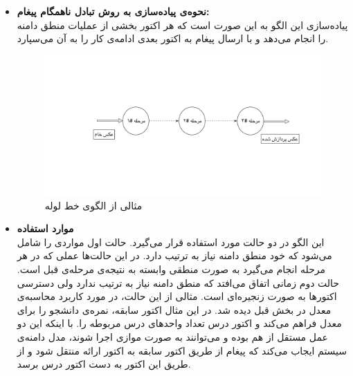 \begin{itemize}
\item\textbf{نحوه‌ی پیاده‌سازی به روش تبادل ناهمگام پیغام:}\\
پیاده‌سازی این الگو به این صورت است که هر اکتور بخشی از عملیات منطق دامنه‌ را انجام می‌دهد و با ارسال پیغام به اکتور بعدی ادامه‌ی کار را به آن می‌سپارد.
\begin{figure}
    \begin{center}
	\includegraphics[width=16cm]{3-RelatedWork/Figures/pipeline.pdf}
    \end{center}
    \caption{\label{fig:pipeline_2}  مثالی از الگوی خط لوله }
\end{figure}

\item\textbf{موارد استفاده}\\
این الگو در دو حالت مورد استفاده قرار می‌گیرد. حالت اول مواردی را شامل می‌شود که خود منطق دامنه نیاز به ترتیب دارد. در این حالت‌ها عملی که در هر مرحله انجام‌ می‌گیرد به صورت منطقی وابسته به نتیجه‌ی مرحله‌ی قبل است. حالت دوم زمانی اتفاق می‌افتد که منطق دامنه نیاز به ترتیب ندارد ولی دسترسی اکتورها به صورت زنجیره‌ای است. مثالی از این حالت،‌ در مورد کاربرد محاسبه‌ی معدل در بخش قبل دیده شد. در این مثال اکتور سابقه، نمره‌ی دانشجو را برای معدل فراهم می‌کند و اکتور درس تعداد واحد‌های درس مربوطه را. با اینکه این دو عمل مستقل از هم بوده و می‌توانند به صورت موازی اجرا شوند،‌ مدل دامنه‌ی سیستم ایجاب می‌کند که پیغام از طریق اکتور سابقه به اکتور ارائه منتقل شود و از طریق این اکتور به دست اکتور درس برسد.


\end{itemize}
